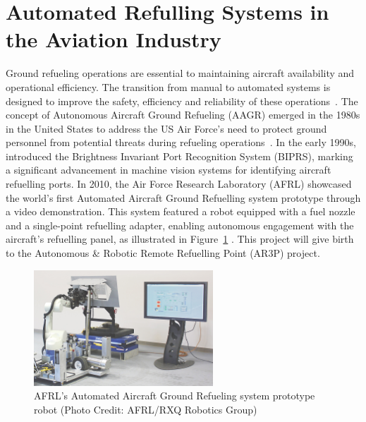 \documentclass[12pt,oneside]{book} %
\begin{document}
\section{Automated Refulling Systems in the Aviation Industry}
Ground refueling operations are essential to maintaining aircraft availability
and operational efficiency. The transition from manual to automated systems is
designed to improve the safety, efficiency and reliability of these
operations~\cite{ExpertSystemsAGR}. The concept of Autonomous Aircraft Ground
Refueling (AAGR) emerged in the 1980s in the United States to address the US
Air Force’s need to protect ground personnel from potential threats during
refueling operations~\cite{Schultz1986}. In the early 1990s,
\citet{Bennett1991} introduced the Brightness Invariant Port Recognition System
(BIPRS), marking a significant advancement in machine vision systems for
identifying aircraft refuelling ports. In 2010, the Air Force Research
Laboratory (AFRL) showcased the world’s first Automated Aircraft Ground
Refuelling system prototype through a video demonstration. This system featured
a robot equipped with a fuel nozzle and a single-point refuelling adapter,
enabling autonomous engagement with the aircraft's refuelling panel, as
illustrated in Figure~\ref{fig:test-2010} \cite{Burnette2010}. This project
will give birth to the Autonomous \& Robotic Remote Refuelling Point (AR3P)
project.

\begin{figure}[H]
    \centering
    \includegraphics[width=0.6\textwidth]{figures/test_2010.jpeg}
    \caption{AFRL's Automated Aircraft Ground Refueling system prototype robot (Photo Credit: AFRL/RXQ Robotics Group)}\label{fig:test-2010}
    \label{fig:test-2010}
\end{figure}
\end{document}

